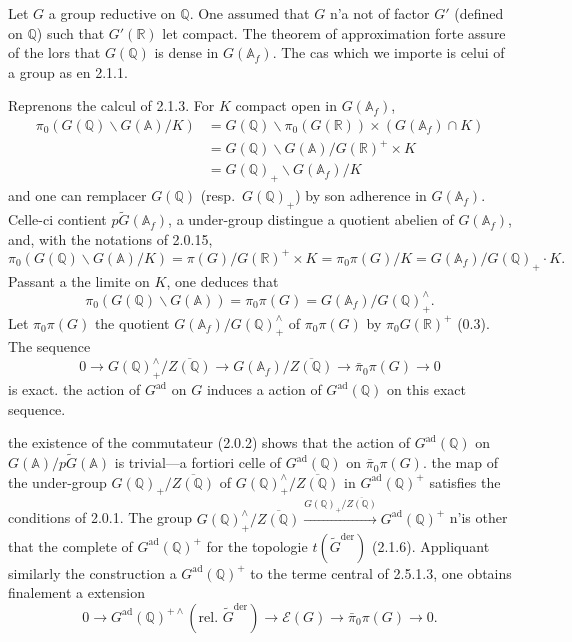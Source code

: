 \documentclass[12pt,a4paper]{article}
\theoremstyle{plain}
\theoremstyle{definition}
\theoremstyle{remark}
\newcommand{\QQ}{\mathbb{Q}}
\newcommand{\RR}{\mathbb{R}}
\newcommand{\Af}{\mathbb{A}_f}
\newcommand{\A}{\mathbb{A}}
\begin{document}
\subsubsection{}

Let $G$ a group reductive on $\QQ$. One assumed that $G$ n'a not of factor $G'$ (defined on $\QQ$) such that $G'(\RR)$ let compact. The theorem of approximation forte assure of the lors that $G(\QQ)$ is dense in $G(\Af)$. The cas which we importe is celui of a group as en 2.1.1.

Reprenons the calcul of 2.1.3. For $K$ compact open in $G(\Af)$,
\begin{equation}\label{eq:2.5.1.1}
\begin{split}
\pi_0(G(\QQ)\backslash G(\A)/K) &= G(\QQ)\backslash \pi_0(G(\RR)) \times (G(\Af) \cap K) \\
&= G(\QQ)\backslash G(\A)/G(\RR)^+ \times K \\
&= G(\QQ)_+\backslash G(\Af)/K
\end{split}
\end{equation}
and one can remplacer $G(\QQ)$ (resp.~$G(\QQ)_+$) by son adherence in $G(\Af)$. Celle-ci contient $p\tilde{G}(\Af)$, a under-group distingue a quotient abelien of $G(\Af)$, and, with the notations of 2.0.15,
\begin{equation}\label{eq:2.5.1.2}
\pi_0(G(\QQ)\backslash G(\A)/K) = \pi(G)/G(\RR)^+ \times K = \pi_0\pi(G)/K = G(\Af)/G(\QQ)_+ \cdot K.
\end{equation}
Passant a the limite on $K$, one deduces that
\[
\pi_0(G(\QQ)\backslash G(\A)) = \pi_0\pi(G) = G(\Af)/G(\QQ)_+^{\wedge}.
\]
Let $\pi_0\pi(G)$ the quotient $G(\Af)/G(\QQ)_+^{\wedge}$ of $\pi_0\pi(G)$ by $\pi_0 G(\RR)^+$ (0.3). The sequence
\begin{equation}\label{eq:2.5.1.3}
0 \to G(\QQ)_+^{\wedge}/\overline{Z(\QQ)} \to G(\Af)/\overline{Z(\QQ)} \to \bar{\pi}_0\pi(G) \to 0
\end{equation}
is exact. the action of $G^{\text{ad}}$ on $G$ induces a action of $G^{\text{ad}}(\QQ)$ on this exact sequence.

the existence of the commutateur (2.0.2) shows that the action of $G^{\text{ad}}(\QQ)$ on $G(\A)/p\tilde{G}(\A)$ is trivial---a fortiori celle of $G^{\text{ad}}(\QQ)$ on $\bar{\pi}_0\pi(G)$. the map of the under-group $G(\QQ)_+/\overline{Z(\QQ)}$ of $G(\QQ)_+^{\wedge}/\overline{Z(\QQ)}$ in $G^{\text{ad}}(\QQ)^+$ satisfies the conditions of 2.0.1. The group $G(\QQ)_+^{\wedge}/\overline{Z(\QQ)} \xrightarrow{G(\QQ)_+/\overline{Z(\QQ)}} G^{\text{ad}}(\QQ)^+$ n'is other that the complete of $G^{\text{ad}}(\QQ)^+$ for the topologie $t(\tilde{G}^{\text{der}})$ (2.1.6). Appliquant similarly the construction a $G^{\text{ad}}(\QQ)^+$ to the terme central of 2.5.1.3, one obtains finalement a extension
\begin{equation}\label{eq:2.5.1.4}
0 \to G^{\text{ad}}(\QQ)^{+\wedge}(\text{rel.~}\tilde{G}^{\text{der}}) \to \mathscr{E}(G) \to \bar{\pi}_0\pi(G) \to 0.
\end{equation}
\end{document}
